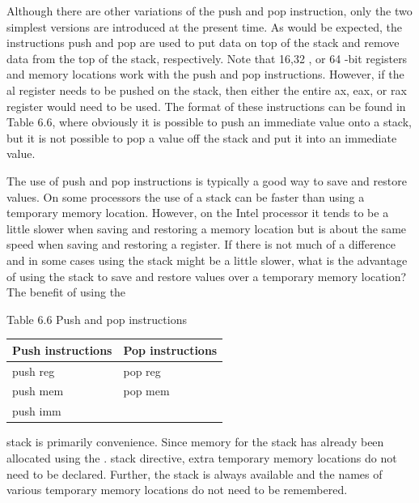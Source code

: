 \documentclass[10pt]{book}
\begin{document}
Although there are other variations of the push and pop instruction, only the two simplest versions are introduced at the present time. As would be expected, the instructions push and pop are used to put data on top of the stack and remove data from the top of the stack, respectively. Note that 16,32 , or 64 -bit registers and memory locations work with the push and pop instructions. However, if the al register needs to be pushed on the stack, then either the entire ax, eax, or rax register would need to be used. The format of these instructions can be found in Table 6.6, where obviously it is possible to push an immediate value onto a stack, but it is not possible to pop a value off the stack and put it into an immediate value.

The use of push and pop instructions is typically a good way to save and restore values. On some processors the use of a stack can be faster than using a temporary memory location. However, on the Intel processor it tends to be a little slower when saving and restoring a memory location but is about the same speed when saving and restoring a register. If there is not much of a difference and in some cases using the stack might be a little slower, what is the advantage of using the stack to save and restore values over a temporary memory location? The benefit of using the

Table 6.6 Push and pop instructions

\begin{center}
\begin{tabular}{|ll|}
\hline
Push instructions & Pop instructions \\
\hline
push reg & pop reg \\
push mem & pop mem \\
push imm &  \\
\hline
\end{tabular}
\end{center}

stack is primarily convenience. Since memory for the stack has already been allocated using the . stack directive, extra temporary memory locations do not need to be declared. Further, the stack is always available and the names of various temporary memory locations do not need to be remembered.
\end{document}
